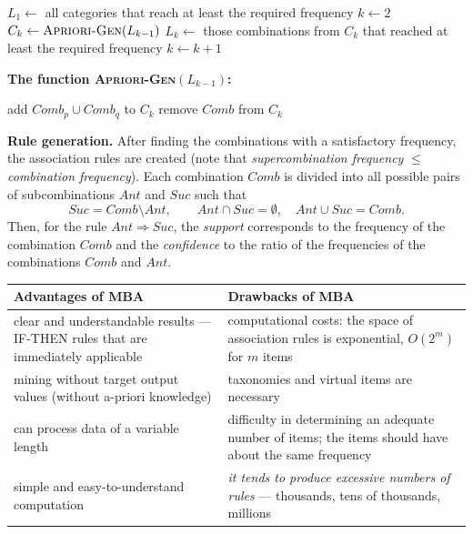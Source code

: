 \documentclass[11pt,a4paper]{article}
\theoremstyle{definition}
\begin{document}
\begin{defbox}
\begin{algorithmic}[1]
\State $L_1\gets$ all categories that reach at least the required frequency
\State $k\gets 2$
  \State $C_k\gets \textsc{Apriori-Gen}(L_{k-1})$ 
  \State $L_k\gets$ those combinations from $C_k$ that reached at least the required frequency
  \State $k\gets k+1$
\EndWhile
\end{algorithmic}

\textbf{The function \textsc{Apriori-Gen}$(L_{k-1})$:}
\begin{algorithmic}[1]
     \State add $\mathit{Comb}_p\cup \mathit{Comb}_q$ to $C_k$ 
  \EndIf
\EndFor
{} 
     \State remove $\mathit{Comb}$ from $C_k$
  \EndIf
\EndFor
\end{algorithmic}
\end{defbox}

\textbf{Rule generation.} After finding the combinations with a satisfactory frequency, the
association rules are created (note that \emph{supercombination frequency} $\le$
\emph{combination frequency}). Each combination $\mathit{Comb}$ is divided into all possible
pairs of subcombinations $\mathit{Ant}$ and $\mathit{Suc}$ such that
\[ \mathit{Suc}=\mathit{Comb}\setminus \mathit{Ant},\qquad
   \mathit{Ant}\cap \mathit{Suc}=\emptyset,\quad \mathit{Ant}\cup \mathit{Suc}=\mathit{Comb}. \]
Then, for the rule $\mathit{Ant}\Rightarrow \mathit{Suc}$, the \emph{support} corresponds to the
frequency of the combination $\mathit{Comb}$ and the \emph{confidence} to the ratio of the
frequencies of the combinations $\mathit{Comb}$ and $\mathit{Ant}$.

\begin{center}
\small
\begin{tabular}{@{}p{7.6cm}p{8.0cm}@{}}
\toprule
\textbf{Advantages of MBA} & \textbf{Drawbacks of MBA} \\
\midrule
clear and understandable results --- IF-THEN rules that are immediately applicable &
  computational costs: the space of association rules is exponential, $O(2^m)$ for $m$ items \\
mining without target output values (without a-priori knowledge) & taxonomies and virtual items
  are necessary \\
can process data of a variable length & difficulty in determining an adequate number of items;
  the items should have about the same frequency \\
simple and easy-to-understand computation & \emph{it tends to produce excessive numbers of
  rules} --- thousands, tens of thousands, millions \\
\bottomrule
\end{tabular}
\end{center}
\end{document}
